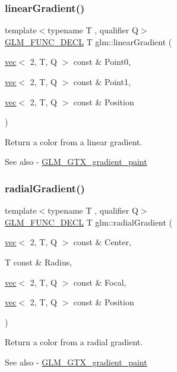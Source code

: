\subsubsection{\texorpdfstring{linear\+Gradient()}{linearGradient()}}
{\footnotesize\ttfamily template$<$typename T , qualifier Q$>$ \\
\hyperlink{setup_8hpp_ab2d052de21a70539923e9bcbf6e83a51}{G\+L\+M\+\_\+\+F\+U\+N\+C\+\_\+\+D\+E\+CL} T glm\+::linear\+Gradient (\begin{DoxyParamCaption}\item[{\hyperlink{structglm_1_1vec}{vec}$<$ 2, T, Q $>$ const \&}]{Point0,  }\item[{\hyperlink{structglm_1_1vec}{vec}$<$ 2, T, Q $>$ const \&}]{Point1,  }\item[{\hyperlink{structglm_1_1vec}{vec}$<$ 2, T, Q $>$ const \&}]{Position }\end{DoxyParamCaption})}

Return a color from a linear gradient. \begin{DoxySeeAlso}{See also}
-\/ \hyperlink{group__gtx__gradient__paint}{G\+L\+M\+\_\+\+G\+T\+X\+\_\+gradient\+\_\+paint} 
\end{DoxySeeAlso}
\mbox{\label{group__gtx__gradient__paint_gaaecb1e93de4cbe0758b882812d4da294}} 
\subsubsection{\texorpdfstring{radial\+Gradient()}{radialGradient()}}
{\footnotesize\ttfamily template$<$typename T , qualifier Q$>$ \\
\hyperlink{setup_8hpp_ab2d052de21a70539923e9bcbf6e83a51}{G\+L\+M\+\_\+\+F\+U\+N\+C\+\_\+\+D\+E\+CL} T glm\+::radial\+Gradient (\begin{DoxyParamCaption}\item[{\hyperlink{structglm_1_1vec}{vec}$<$ 2, T, Q $>$ const \&}]{Center,  }\item[{T const \&}]{Radius,  }\item[{\hyperlink{structglm_1_1vec}{vec}$<$ 2, T, Q $>$ const \&}]{Focal,  }\item[{\hyperlink{structglm_1_1vec}{vec}$<$ 2, T, Q $>$ const \&}]{Position }\end{DoxyParamCaption})}

Return a color from a radial gradient. \begin{DoxySeeAlso}{See also}
-\/ \hyperlink{group__gtx__gradient__paint}{G\+L\+M\+\_\+\+G\+T\+X\+\_\+gradient\+\_\+paint} 
\end{DoxySeeAlso}
